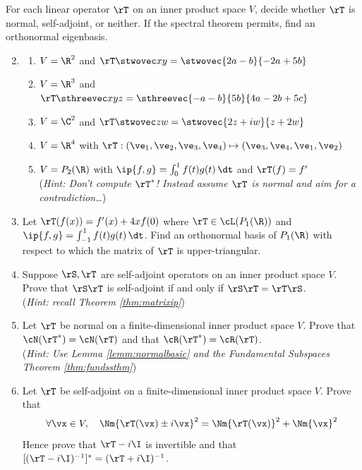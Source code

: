 \begin{exercises}
\exstart For each linear operator $\rT$ on an inner product space $V$, decide whether $\rT$ is normal, self-adjoint, or neither. If the spectral theorem permits, find an orthonormal eigenbasis.
\begin{enumerate}\setcounter{enumi}{1}
  \item[]\begin{enumerate}
    \item $V=\R^2$ and $\rT\stwovec xy=\stwovec{2a-b}{-2a+5b}$
    \item $V=\R^3$ and $\rT\sthreevec xyz=\sthreevec{-a-b}{5b}{4a-2b+5c}$
    \item $V=\C^2$ and $\rT\stwovec zw=\stwovec{2z+iw}{z+2w}$
    \item $V=\R^4$ with $\rT:(\ve_1,\ve_2,\ve_3,\ve_4)\mapsto (\ve_3,\ve_4,\ve_1,\ve_2)$
    \item $V=P_2(\R)$ with $\ip{f,g}=\int_0^1f(t)g(t)\,\dt$ and $\rT(f)=f'$\\[2pt]
    (\emph{Hint: Don't compute $\rT^*$! Instead assume $\rT$ is normal and aim for a contradiction\ldots})
  \end{enumerate}
  
  \item Let $\rT(f(x))=f'(x)+4xf(0)$ where $\rT\in\cL(P_1(\R))$ and $\ip{f,g}=\int_{-1}^1f(t)g(t)\,\dt$. Find an orthonormal basis of $P_1(\R)$ with respect to which the matrix of $\rT$ is upper-triangular.
  
  \item Suppose $\rS,\rT$ are self-adjoint operators on an inner product space $V$. Prove that $\rS\rT$ is self-adjoint if and only if $\rS\rT=\rT\rS$.\\[2pt]
  (\emph{Hint: recall Theorem \ref{thm:matrixip}})
  
  
  
  \item Let $\rT$ be normal on a finite-dimensional inner product space $V$. Prove that $\cN(\rT^*)=\cN(\rT)$ and that $\cR(\rT^*)=\cR(\rT)$.\\[2pt]
  (\emph{Hint: Use Lemma \ref{lemm:normalbasic} and the Fundamental Subspaces Theorem \ref{thm:fundssthm}})
  
  \item Let $\rT$ be self-adjoint on a finite-dimensional inner product space $V$. Prove that
  \[\forall\vx\in V,\quad \Nm{\rT(\vx)\pm i\vx}^2=\Nm{\rT(\vx)}^2+\Nm{\vx}^2\]
  Hence prove that $\rT-i\I$ is invertible and that $[(\rT-i\I)^{-1}]^*=(\rT+i\I)^{-1}$.
  

\end{enumerate}
\end{exercises}
